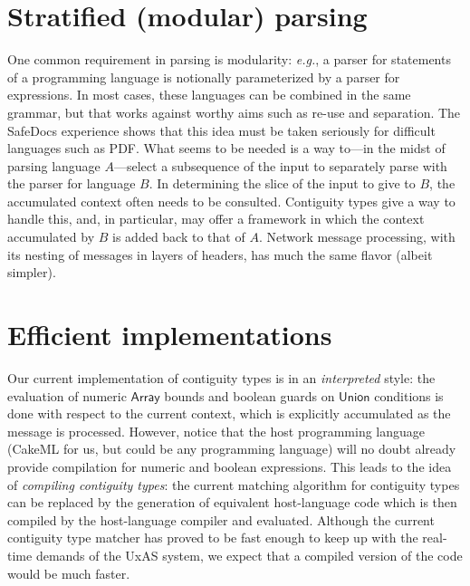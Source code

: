 \documentclass{article}
\newcommand{\eg}{\textit{e.g.}}
\newcommand{\konst}[1]{\ensuremath{\mathsf{#1}}}
\theoremstyle{definition}
\begin{document}
\section{Stratified (modular) parsing}

 One common requirement in parsing is modularity: \eg, a parser for
 statements of a programming language is notionally parameterized by a
 parser for expressions. In most cases, these languages can be
 combined in the same grammar, but that works against worthy aims such
 as re-use and separation. The SafeDocs experience shows that this
 idea must be taken seriously for difficult languages such as
 PDF. What seems to be needed is a way to---in the midst of parsing
 language $A$---select a subsequence of the input to separately parse
 with the parser for language $B$. In determining the slice of the
 input to give to $B$, the accumulated context often needs to be
 consulted. Contiguity types give a way to handle this, and, in
 particular, may offer a framework in which the context accumulated by
 $B$ is added back to that of $A$. Network message processing, with
 its nesting of messages in layers of headers, has much the same
 flavor (albeit simpler).

\section{Efficient implementations}

Our current implementation of contiguity types is in an
\emph{interpreted} style: the evaluation of numeric \konst{Array}
bounds and boolean guards on \konst{Union} conditions is done with
respect to the current context, which is explicitly accumulated as the
message is processed. However, notice that the host programming
language (CakeML for us, but could be any programming language) will
no doubt already provide compilation for numeric and boolean
expressions. This leads to the idea of \emph{compiling contiguity
  types}: the current matching algorithm for contiguity types can be
replaced by the generation of equivalent host-language code which is
then compiled by the host-language compiler and evaluated. Although
the current contiguity type matcher has proved to be fast enough to
keep up with the real-time demands of the UxAS system, we expect that
a compiled version of the code would be much faster.
\end{document}
